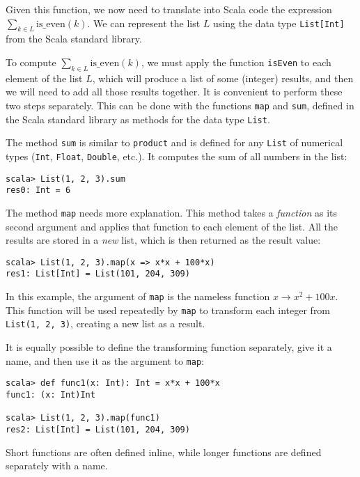 Given this function, we now need to translate into Scala code the
expression $\sum_{k\in L}\text{is\_even}\left(k\right)$. We can represent
the list $L$ using the data type \lstinline!List[Int]! from the
Scala standard library.

To compute $\sum_{k\in L}\text{is\_even}\left(k\right)$, we must
apply the function \texttt{}\lstinline!isEven! to each element of
the list $L$, which will produce a list of some (integer) results,
and then we will need to add all those results together. It is convenient
to perform these two steps separately. This can be done with the functions
\texttt{}\lstinline!map! and \lstinline!sum!, defined in the Scala
standard library as methods for the data type \lstinline!List!.

The method \texttt{}\lstinline!sum! is similar to \lstinline!product!
and is defined for any \lstinline!List! of numerical types (\lstinline!Int!,
\lstinline!Float!, \lstinline!Double!, etc.). It computes the sum
of all numbers in the list:
\begin{lstlisting}
scala> List(1, 2, 3).sum
res0: Int = 6
\end{lstlisting}

The method \texttt{}\lstinline!map! needs more explanation. This
method takes a \emph{function} as its second argument and applies
that function to each element of the list. All the results are stored
in a \emph{new }list, which is then returned as the result value:

\begin{lstlisting}
scala> List(1, 2, 3).map(x => x*x + 100*x)
res1: List[Int] = List(101, 204, 309)
\end{lstlisting}

In this example, the argument of \lstinline!map! is the nameless
function $x\rightarrow x^{2}+100x$. This function will be used repeatedly
by \texttt{}\lstinline!map! to transform each integer from \lstinline!List(1, 2, 3)!,
creating a new list as a result.

It is equally possible to define the transforming function separately,
give it a name, and then use it as the argument to \lstinline!map!:
\begin{lstlisting}
scala> def func1(x: Int): Int = x*x + 100*x
func1: (x: Int)Int 

scala> List(1, 2, 3).map(func1)
res2: List[Int] = List(101, 204, 309)
\end{lstlisting}
Short functions are often defined inline, while longer functions are
defined separately with a name.

